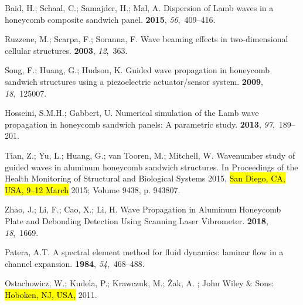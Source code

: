 \documentclass[sensors,article,accept,moreauthors,pdftex]{Definitions/mdpi}
\begin{document}
\begin{thebibliography}{999}
Baid, H.; Schaal, C.; Samajder, H.; Mal, A.
\newblock Dispersion of Lamb waves in a honeycomb composite sandwich panel.
 {\bf 2015}, {\em 56},~409--416.

Ruzzene, M.; Scarpa, F.; Soranna, F.
\newblock Wave beaming effects in two-dimensional cellular structures.
 {\bf 2003}, {\em 12},~363.

Song, F.; Huang, G.; Hudson, K.
\newblock Guided wave propagation in honeycomb sandwich structures using a
  piezoelectric actuator/sensor system.
 {\bf 2009}, {\em 18},~125007.

Hosseini, S.M.H.; Gabbert, U.
\newblock Numerical simulation of the Lamb wave propagation in honeycomb
  sandwich panels: A parametric study.
 {\bf 2013}, {\em 97},~189--201.

Tian, Z.; Yu, L.; Huang, G.; van Tooren, M.; Mitchell, W.
\newblock Wavenumber study of guided waves in aluminum honeycomb sandwich
  structures.
\newblock   In Proceedings of the Health Monitoring of Structural and Biological Systems 2015, \hl{San Diego, CA, USA, 9--12 March} 2015; Volume 9438, p. 943807.%

Zhao, J.; Li, F.; Cao, X.; Li, H.
\newblock Wave Propagation in Aluminum Honeycomb Plate and Debonding Detection
  Using Scanning Laser Vibrometer.
 {\bf 2018}, {\em 18},~1669.

Patera, A.T.
\newblock A spectral element method for fluid dynamics: laminar flow in a
  channel expansion.
 {\bf 1984}, {\em 54},~468--488.

Ostachowicz, W.; Kudela, P.; Krawczuk, M.; {\.Z}ak, A.
; John Wiley \& Sons:  \hl{Hoboken, NJ, USA,} 2011.%


\end{thebibliography}
\end{document}
